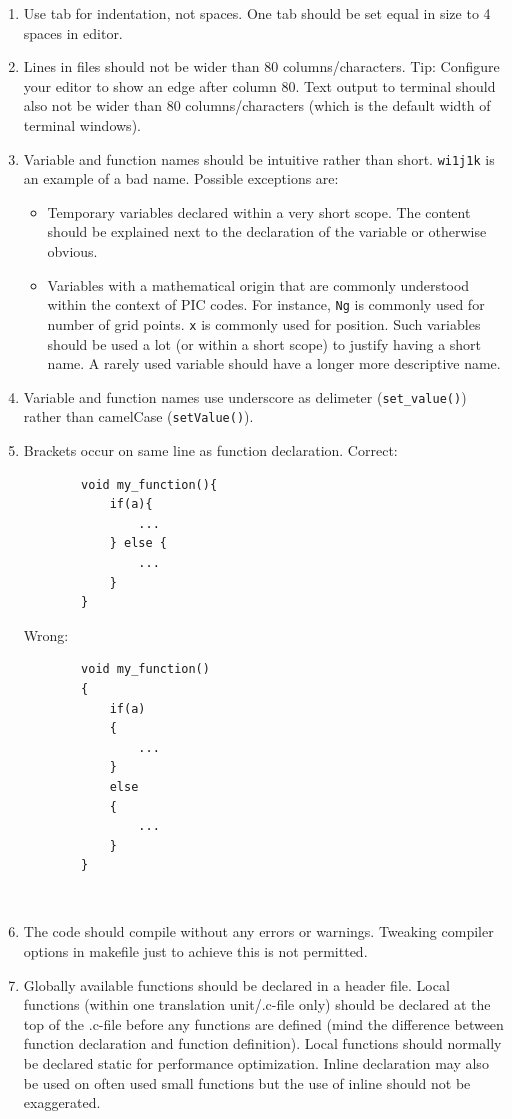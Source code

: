 \documentclass[10pt,a4paper]{article}
\begin{document}
\begin{enumerate}
	\item Use tab for indentation, not spaces. One tab should be set equal in size to 4 spaces in editor.
	\item Lines in files should not be wider than 80 columns/characters. Tip: Configure your editor to show an edge after column 80. Text output to terminal should also not be wider than 80 columns/characters (which is the default width of terminal windows).
	\item Variable and function names should be intuitive rather than short. \lstinline$wi1j1k$ is an example of a bad name. Possible exceptions are:
		\begin{itemize}
			\item Temporary variables declared within a very short scope. The content should be explained next to the declaration of the variable or otherwise obvious.
			\item Variables with a mathematical origin that are commonly understood within the context of PIC codes. For instance, \lstinline$Ng$ is commonly used for number of grid points. \lstinline$x$ is commonly used for position. Such variables should be used a lot (or within a short scope) to justify having a short name. A rarely used variable should have a longer more descriptive name.
		\end{itemize}
	\item Variable and function names use underscore as delimeter (\lstinline$set_value()$) rather than camelCase (\lstinline$setValue()$).
	\item Brackets occur on same line as function declaration. Correct:
	\begin{lstlisting}
		void my_function(){
			if(a){
				...
			} else {
				...
			}
		}
	\end{lstlisting}
	Wrong:
	\begin{lstlisting}
		void my_function()
		{
			if(a)
			{
				...
			}
			else
			{
				...
			}
		}
	\end{lstlisting}\
	\item The code should compile without any errors or warnings. Tweaking compiler options in makefile just to achieve this is not permitted.
	\item Globally available functions should be declared in a header file. Local functions (within one translation unit/.c-file only) should be declared at the top of the .c-file before any functions are defined (mind the difference between function declaration and function definition). Local functions should normally be declared static for performance optimization. Inline declaration may also be used on often used small functions but the use of inline should not be exaggerated.

\end{enumerate}
\end{document}
